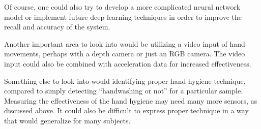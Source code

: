 \documentclass[]{report}
\begin{document}
Of course, one could also try to develop a more complicated neural network model or implement future deep learning techniques in order to improve the recall and accuracy of the system.

Another important area to look into would be utilizing a video input of hand movements, perhaps with a depth camera or just an RGB camera. The video input could also be combined with acceleration data for increased effectiveness.

Something else to look into would identifying proper hand hygiene technique, compared to simply detecting ``handwashing or not'' for a particular sample. Measuring the effectiveness of the hand hygiene may need many more sensors, as discussed above. It could also be difficult to express proper technique in a way that would generalize for many subjects.










\end{document}
